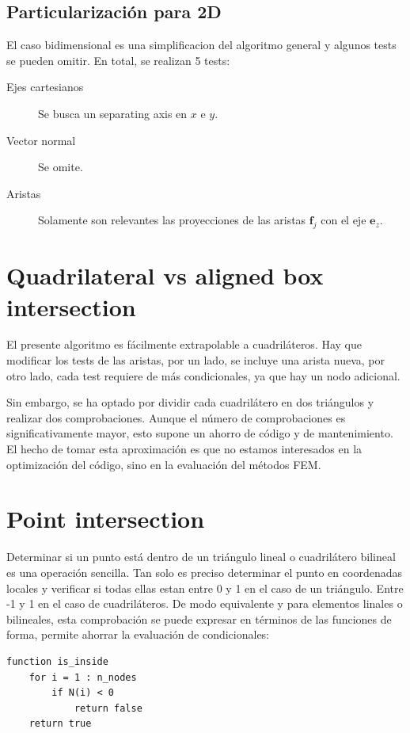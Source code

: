 \subsection{Particularización para 2D}

El caso bidimensional es una simplificacion del algoritmo general y algunos tests se pueden omitir. En total, se realizan 5 tests:
\begin{description}
    \item[Ejes cartesianos] Se busca un separating axis en $x$ e $y$.
    \item[Vector normal] Se omite.
    \item[Aristas] Solamente son relevantes las proyecciones de las aristas $\mathbf{f}_j$ con el eje $\mathbf{e}_z$.  
\end{description}



\section{Quadrilateral vs aligned box intersection}

El presente algoritmo es fácilmente extrapolable a cuadriláteros. Hay que modificar los tests de las aristas, por un lado, se incluye una arista nueva, por otro lado, cada test requiere de más condicionales, ya que hay un nodo adicional.

Sin embargo, se ha optado por dividir cada cuadrilátero en dos triángulos y realizar dos comprobaciones. Aunque el número de comprobaciones es significativamente mayor, esto supone un ahorro de código y de mantenimiento. El hecho de tomar esta aproximación es que no estamos interesados en la optimización del código, sino en la evaluación del métodos FEM.



\section{Point intersection}

Determinar si un punto está dentro de un triángulo lineal o cuadrilátero bilineal es una operación sencilla. Tan solo es preciso determinar el punto en coordenadas locales y verificar si todas ellas estan entre 0 y 1 en el caso de un triángulo. Entre -1 y 1 en el caso de cuadriláteros. De modo equivalente y para elementos linales o bilineales, esta comprobación se puede expresar en términos de las funciones de forma, permite ahorrar la evaluación de condicionales:
\begin{verbatim}
function is_inside
    for i = 1 : n_nodes
        if N(i) < 0
            return false
    return true
\end{verbatim}



